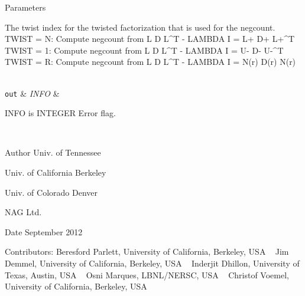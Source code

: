 \begin{DoxyParams}[1]{Parameters}
\begin{DoxyVerb}
          The twist index for the twisted factorization that is used
          for the negcount.
          TWIST = N: Compute negcount from L D L^T - LAMBDA I = L+ D+ L+^T
          TWIST = 1: Compute negcount from L D L^T - LAMBDA I = U- D- U-^T
          TWIST = R: Compute negcount from L D L^T - LAMBDA I = N(r) D(r) N(r)\end{DoxyVerb}
\\
\hline
\mbox{\tt out}  & {\em I\+N\+F\+O} & \begin{DoxyVerb}          INFO is INTEGER
          Error flag.\end{DoxyVerb}
 \\
\hline
\end{DoxyParams}
\begin{DoxyAuthor}{Author}
Univ. of Tennessee 

Univ. of California Berkeley 

Univ. of Colorado Denver 

N\+A\+G Ltd. 
\end{DoxyAuthor}
\begin{DoxyDate}{Date}
September 2012 
\end{DoxyDate}
\begin{DoxyParagraph}{Contributors\+: }
Beresford Parlett, University of California, Berkeley, U\+S\+A ~\newline
 Jim Demmel, University of California, Berkeley, U\+S\+A ~\newline
 Inderjit Dhillon, University of Texas, Austin, U\+S\+A ~\newline
 Osni Marques, L\+B\+N\+L/\+N\+E\+R\+S\+C, U\+S\+A ~\newline
 Christof Voemel, University of California, Berkeley, U\+S\+A 
\end{DoxyParagraph}
\hypertarget{group__auxOTHERauxiliary_gac6a65096bc8be9a4dc881a96147075ea}{}
